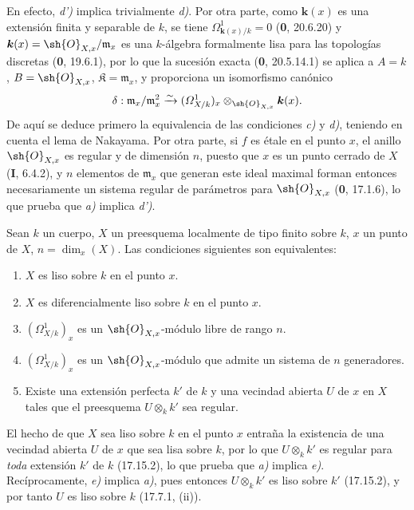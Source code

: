 En efecto, \emph{d')} implica trivialmente \emph{d)}. Por otra parte, como $\boldsymbol k(x)$ es una extensión finita y separable de $k$, se tiene $\Omega^1_{\mathbf k(x)/k}=0$ (\textbf 0, 20.6.20) y $\boldsymbol k(x)=\sh{O}_{X,x}/\mathfrak m_x$ es una $k$-álgebra formalmente lisa para las topologías discretas (\textbf 0, 19.6.1), por lo que la sucesión exacta (\textbf 0, 20.5.14.1) se aplica a $A=k$, $B=\sh{O}_{X,x}$, $\mathfrak K=\mathfrak m_x$, y proporciona un isomorfismo canónico
\[
\delta:\mathfrak m_x/\mathfrak m_x^2\xrightarrow{\sim}(\varOmega^1_{X/k})_x\otimes_{\sh{O}_{X,x}}\boldsymbol k(x).
\]
De aquí se deduce primero la equivalencia de las condiciones \emph{c)} y \emph{d)}, teniendo en cuenta el lema de Nakayama. Por otra parte, si $f$ es étale en el punto $x$, el anillo $\sh{O}_{X,x}$ es regular y de dimensión $n$, puesto que $x$ es un punto cerrado de $X$ (\textbf I, 6.4.2), y $n$ elementos de $\mathfrak m_x$ que generan este ideal maximal forman entonces necesariamente un sistema regular de parámetros para $\sh{O}_{X,x}$ (\textbf 0, 17.1.6), lo que prueba que \emph{a)} implica \emph{d')}.

\begin{proposition}[17.15.5]
\label{IV.17.15.5}
Sean $k$ un cuerpo, $X$ un preesquema localmente de tipo finito sobre $k$, $x$ un punto de $X$, $n=\dim_x(X)$. Las condiciones siguientes son equivalentes:
\begin{enumerate}
  \item[\textup{a)}] $X$ es liso sobre $k$ en el punto $x$.
  \item[\textup{b)}] $X$ es diferencialmente liso sobre $k$ en el punto $x$.
  \item[\textup{c)}] $(\varOmega^1_{X/k})_x$ es un $\sh{O}_{X,x}$-módulo libre de rango $n$.
  \item[\textup{d)}] $(\varOmega^1_{X/k})_x$ es un $\sh{O}_{X,x}$-módulo que admite un sistema de $n$ generadores.


  \item[\textup{e)}] Existe una extensión perfecta $k'$ de $k$ y una vecindad abierta $U$ de $x$ en $X$ tales que el preesquema $U\otimes_k k'$ sea regular.
\end{enumerate}
\end{proposition}

El hecho de que $X$ sea liso sobre $k$ en el punto $x$ entraña la existencia de una vecindad abierta $U$ de $x$ que sea lisa sobre $k$, por lo que $U\otimes_k k'$ es regular para \emph{toda} extensión $k'$ de $k$ (17.15.2), lo que prueba que \emph{a)} implica \emph{e)}. Recíprocamente, \emph{e)} implica \emph{a)}, pues entonces $U\otimes_k k'$ es liso sobre $k'$ (17.15.2), y por tanto $U$ es liso sobre $k$ (17.7.1, (ii)).

